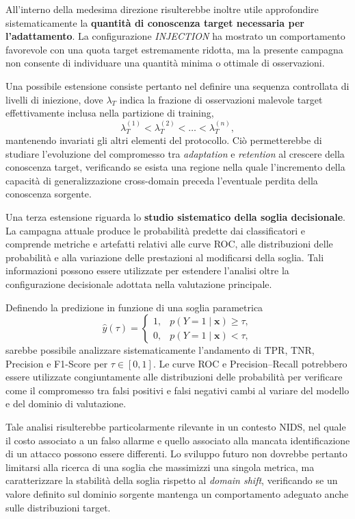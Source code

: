 All'interno della medesima direzione risulterebbe inoltre utile approfondire sistematicamente la \textbf{quantità di conoscenza target necessaria per l'adattamento}.
La configurazione \textit{INJECTION} ha mostrato un comportamento favorevole con una quota target estremamente ridotta, ma la presente campagna non consente di individuare una quantità minima o ottimale di osservazioni.

Una possibile estensione consiste pertanto nel definire una sequenza controllata di livelli di iniezione, dove $\lambda_T$ indica la frazione di osservazioni malevole target effettivamente inclusa nella partizione di training,
\[
    \lambda_{T}^{(1)} < \lambda_{T}^{(2)} < \dots < \lambda_{T}^{(n)},
\]
mantenendo invariati gli altri elementi del protocollo.
Ciò permetterebbe di studiare l'evoluzione del compromesso tra \textit{adaptation} e \textit{retention} al crescere della conoscenza target, verificando se esista una regione nella quale l'incremento della capacità di generalizzazione cross-domain preceda l'eventuale perdita della conoscenza sorgente.

Una terza estensione riguarda lo \textbf{studio sistematico della soglia decisionale}.
La campagna attuale produce le probabilità predette dai classificatori e comprende metriche e artefatti relativi alle curve ROC, alle distribuzioni delle probabilità e alla variazione delle prestazioni al modificarsi della soglia.
Tali informazioni possono essere utilizzate per estendere l'analisi oltre la configurazione decisionale adottata nella valutazione principale.

Definendo la predizione in funzione di una soglia parametrica
\[
    \hat{y}(\tau) =
    \begin{cases}
        1, & p(Y=1 \mid \mathbf{x}) \geq \tau, \\
        0, & p(Y=1 \mid \mathbf{x}) < \tau,
    \end{cases}
\]
sarebbe possibile analizzare sistematicamente l'andamento di TPR, TNR, Precision e F1-Score per $\tau \in [0,1]$.
Le curve ROC e Precision--Recall potrebbero essere utilizzate congiuntamente alle distribuzioni delle probabilità per verificare come il compromesso tra falsi positivi e falsi negativi cambi al variare del modello e del dominio di valutazione.

Tale analisi risulterebbe particolarmente rilevante in un contesto NIDS, nel quale il costo associato a un falso allarme e quello associato alla mancata identificazione di un attacco possono essere differenti.
Lo sviluppo futuro non dovrebbe pertanto limitarsi alla ricerca di una soglia che massimizzi una singola metrica, ma caratterizzare la stabilità della soglia rispetto al \textit{domain shift}, verificando se un valore definito sul dominio sorgente mantenga un comportamento adeguato anche sulle distribuzioni target.

